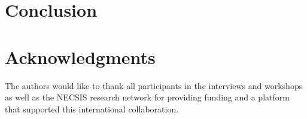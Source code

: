 \documentclass[10pt,journal,compsoc,letterpaper]{IEEEtran}
\begin{document}




\section{Conclusion}\label{sec:conclusion}


\section*{Acknowledgments}
The authors would like to thank all participants in the interviews and workshops as well as the NECSIS research network for providing funding and a platform that supported this international collaboration.










\end{document}
